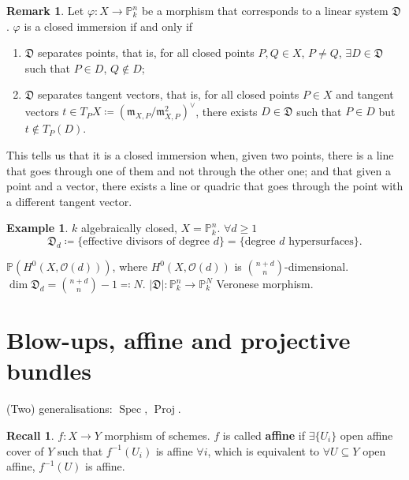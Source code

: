 \documentclass[12pt]{article}
\DeclareMathOperator{\Spec}{Spec}
\DeclareMathOperator{\Proj}{Proj}
\theoremstyle{definition}
\newtheorem*{remark}{Remark}
\newtheorem*{recall}{Recall}
\newtheorem*{example}{Example}
\begin{document}
\begin{remark}
Let $\varphi:X\rightarrow\mathbb{P}_k^n$ be a morphism that corresponds to a linear system $\mathfrak{D}$. $\varphi$ is a closed immersion if and only if
\begin{enumerate}[label=\arabic*)]
\item $\mathfrak{D}$ separates points, that is, for all closed points $P,Q\in X$, $P\neq Q$, $\exists D\in\mathfrak{D}$ such that $P\in D$, $Q\notin D$;
\item $\mathfrak{D}$ separates tangent vectors, that is, for all closed points $P\in X$ and tangent vectors $t\in T_PX\coloneqq(\mathfrak{m}_{X,P}/\mathfrak{m}_{X,P}^2)^{\vee}$, there exists $D\in\mathfrak{D}$ such that $P\in D$ but $t\notin T_P(D)$.
\end{enumerate}
\end{remark}

This tells us that it is a closed immersion when, given two points, there is a line that goes through one of them and not through the other one; and that given a point and a vector, there exists a line or quadric that goes through the point with a different tangent vector.

\begin{example}
$k$ algebraically closed, $X=\mathbb{P}_k^n$. $\forall d\geq1$
\[\mathfrak{D}_d\coloneqq\{\text{effective divisors of degree }d\}=\{\text{degree }d\text{ hypersurfaces}\}.\]

$\mathbb{P}(H^0(X,\mathcal{O}(d)))$, where $H^0(X,\mathcal{O}(d))$ is $\binom{n+d}{n}$-dimensional. $\dim\mathfrak{D}_d=\binom{n+d}{n}-1\eqqcolon N$. $|\mathfrak{D}|:\mathbb{P}_k^n\rightarrow\mathbb{P}_k^N$ Veronese morphism.
\end{example}

\section{Blow-ups, affine and projective bundles}
(Two) generalisations: $\Spec$, $\Proj$.

\begin{recall}
$f:X\rightarrow Y$ morphism of schemes. $f$ is called \textbf{affine} if $\exists\{U_i\}$ open affine cover of $Y$ such that $f^{-1}(U_i)$ is affine $\forall i$, which is equivalent to $\forall U\subseteq Y$ open affine, $f^{-1}(U)$ is affine.
\end{recall}
\end{document}
